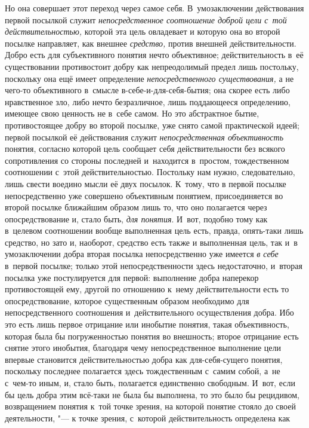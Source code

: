 Но она совершает этот переход через самое себя.
В~умозаключении действования первой посылкой служит
{\em непосредственное соотношение доброй
цели с~той действительностью,} которой эта цель овладевает и
которую она во второй посылке направляет, как внешнее {\em средство,} против
внешней действительности. Добро есть для субъективного понятия нечто
объективное; действительность в~её существовании противостоит добру как
непреодолимый предел лишь постольку, поскольку она ещё имеет определение
{\em непосредственного существования,}
а не чего-то объективного в~смысле в-себе-и-для-себя-бытия;
она скорее есть либо нравственное зло, либо нечто безразличное, лишь
поддающееся определению, имеющее свою ценность не в~себе самом. Но это
абстрактное бытие, противостоящее добру во второй посылке,
уже снято самой практической идеей; первой посылкой её действования служит
{\em непосредственная объективность}
понятия, согласно которой цель сообщает себя действительности
без всякого сопротивления со стороны последней и~находится в~простом,
тождественном соотношении с~этой действительностью. Постольку нам нужно,
следовательно, лишь свести воедино мысли её двух посылок. К~тому, что в
первой посылке непосредственно уже совершено объективным понятием,
присоединяется во второй посылке ближайшим образом лишь то, что оно
полагается через опосредствование и, стало быть,
{\em для понятия}. И~вот,
подобно тому как в~целевом соотношении вообще выполненная цель есть,
правда, опять-таки лишь средство, но зато и, наоборот, средство есть также
и выполненная цель, так и~в умозаключении добра вторая посылка
непосредственно уже имеется {\em в
себе} в~первой посылке; только этой непосредственности здесь
недостаточно, и~вторая посылка уже постулируется для первой: выполнение
добра наперекор противостоящей ему, другой по отношению к~нему
действительности есть то опосредствование, которое существенным образом
необходимо для непосредственного соотношения и~действительного
осуществления добра. Ибо это есть лишь первое отрицание или инобытие
понятия, такая объективность, которая была бы погруженностью понятия во
внешность; второе отрицание есть снятие этого инобытия, благодаря чему
непосредственное выполнение цели впервые становится действительностью добра
как для-себя-сущего понятия, поскольку последнее полагается здесь
тождественным с~самим собой, а~не с~чем-то иным, и, стало быть,
полагается единственно свободным. И~вот, если бы цель добра этим всё-таки
не была бы выполнена, то это было бы рецидивом, возвращением понятия к~той
точке зрения, на которой понятие стояло до своей деятельности, "---
к точке зрения, с~которой действительность определена как
